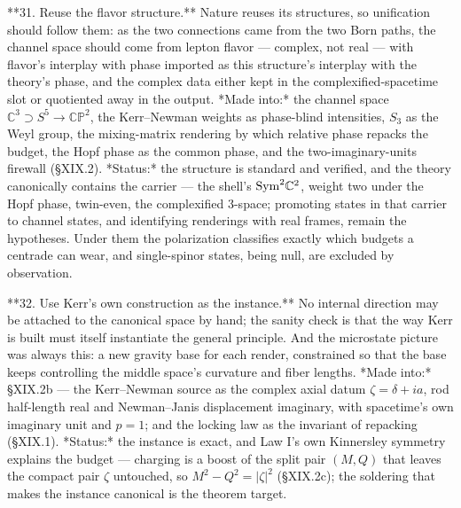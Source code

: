 **31. Reuse the flavor structure.** Nature reuses its structures, so unification should follow them: as the two connections came from the two Born paths, the channel space should come from lepton flavor — complex, not real — with flavor's interplay with phase imported as this structure's interplay with the theory's phase, and the complex data either kept in the complexified-spacetime slot or quotiented away in the output. *Made into:* the channel space $\mathbb C^3\supset S^5\to\mathbb{CP}^2$, the Kerr–Newman weights as phase-blind intensities, $S_3$ as the Weyl group, the mixing-matrix rendering by which relative phase repacks the budget, the Hopf phase as the common phase, and the two-imaginary-units firewall (§XIX.2). *Status:* the structure is standard and verified, and the theory canonically contains the carrier — the shell's ${\rm Sym}^2\mathbb C^2$, weight two under the Hopf phase, twin-even, the complexified 3-space; promoting states in that carrier to channel states, and identifying renderings with real frames, remain the hypotheses. Under them the polarization classifies exactly which budgets a centrade can wear, and single-spinor states, being null, are excluded by observation.

**32. Use Kerr's own construction as the instance.** No internal direction may be attached to the canonical space by hand; the sanity check is that the way Kerr is built must itself instantiate the general principle. And the microstate picture was always this: a new gravity base for each render, constrained so that the base keeps controlling the middle space's curvature and fiber lengths. *Made into:* §XIX.2b — the Kerr–Newman source as the complex axial datum $\zeta = \delta+ia$, rod half-length real and Newman–Janis displacement imaginary, with spacetime's own imaginary unit and $p = 1$; and the locking law as the invariant of repacking (§XIX.1). *Status:* the instance is exact, and Law I's own Kinnersley symmetry explains the budget — charging is a boost of the split pair $(M,Q)$ that leaves the compact pair $\zeta$ untouched, so $M^2-Q^2 = |\zeta|^2$ (§XIX.2c); the soldering that makes the instance canonical is the theorem target.

